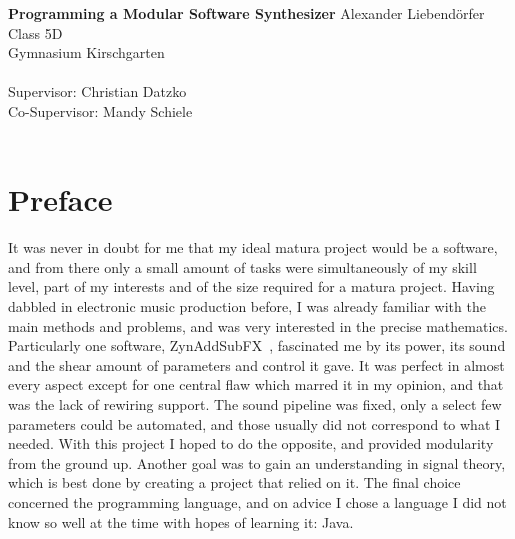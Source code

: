 \documentclass[11pt,a4paper]{article}
\date{13th December 2013}
\begin{document}
\begin{titlepage}
\centering
{\LARGE \textbf {Programming a Modular Software Synthesizer}\vspace{2em}}
\linespread{2}
\large{Alexander Liebend\"{o}rfer\\Class 5D\\Gymnasium Kirschgarten\\~\\
Supervisor: Christian Datzko\\Co-Supervisor: Mandy Schiele\\~\\}

\vspace{10em}
\end{titlepage}

\tableofcontents
\listoffigures
\clearpage

\section{Preface}

It was never in doubt for me that my ideal matura project would be a software, and from there only a small amount of tasks were simultaneously of my skill level, part of my interests and of the size required for a matura project. Having dabbled in electronic music production before, I was already familiar with the main methods and problems, and was very interested in the precise mathematics. Particularly one software, ZynAddSubFX~\cite{ZASF}, fascinated me by its power, its sound and the shear amount of parameters and control it gave. It was perfect in almost every aspect except for one central flaw which marred it in my opinion, and that was the lack of rewiring support. The sound pipeline was fixed, only a select few parameters could be automated, and those usually did not correspond to what I needed. With this project I hoped to do the opposite, and provided modularity from the ground up. Another goal was to gain an understanding in signal theory, which is best done by creating a project that relied on it. The final choice concerned the programming language, and on advice I chose a language I did not know so well at the time with hopes of learning it: Java.
\end{document}

